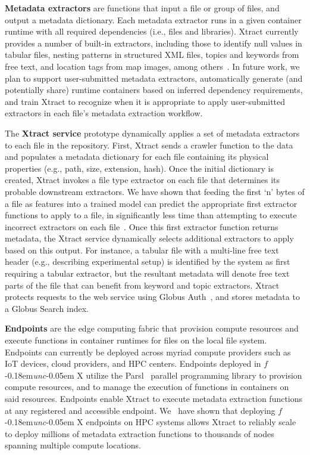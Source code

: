\documentclass[sigconf, 9pt]{acmart}
\newcommand{\name}{Xtract}
\newcommand{\funcx}{$f$\kern-0.18em\emph{unc}\kern-0.05em X}
\begin{document}
\textbf{Metadata extractors} are functions that input a file or group of files, and output a metadata dictionary. 
Each metadata extractor runs in a given container runtime with all required dependencies (i.e., files and 
libraries).  \name{} currently provides a number of built-in extractors, including
those to identify null values in tabular files, nesting patterns in structured XML files, topics and keywords from free text, and location tags from map images, 
among others~\cite{skluzacek2019serverless}. In future work, 
we plan to support user-submitted metadata extractors, automatically generate (and potentially share) runtime containers based on inferred 
dependency requirements, and train \name{} to recognize when it is appropriate to apply user-submitted extractors in each file's metadata extraction workflow. 

The \textbf{\name{} service} prototype dynamically applies a set of metadata extractors to each file in the repository. 
First, \name{} sends a crawler function to the data and populates a metadata dictionary for each file containing
its physical properties (e.g., path, size, extension, hash).  Once the initial dictionary is created, \name{} invokes a file type extractor on each 
file that determines its probable downstream extractors. We have shown that feeding 
the first `n' bytes of a file as features into 
a trained model can predict the appropriate first extractor functions to apply to a file, in significantly less time
than attempting to execute incorrect extractors on each file~\cite{skluzacek2018skluma}. Once this first extractor function returns metadata, the \name{} service dynamically selects additional extractors to apply based on this output.  For instance, 
a tabular file with a multi-line free text header (e.g., describing experimental setup) is identified by the system as first requiring a tabular extractor, but 
the resultant metadata will denote free text parts of the file that can benefit from keyword and topic extractors.
\name{} protects requests to the web service using Globus Auth~\cite{tuecke2016globus}, and stores metadata to a Globus Search index. 

\textbf{Endpoints} are the edge computing fabric that provision compute resources and execute functions in container runtimes for files on the local file system.
 Endpoints can currently be deployed across myriad compute providers such as IoT devices, cloud providers, and HPC centers.  
Endpoints deployed in \funcx{} utilize the Parsl~\cite{babuji2019parsl} parallel programming library to 
provision compute resources, and to manage the execution of functions in containers on said resources. Endpoints enable 
\name{} to execute metadata extraction functions at any registered and accessible endpoint. We~\cite{chard2019serverless} have shown that deploying \funcx{} 
endpoints on HPC systems allows \name{} to reliably
scale to deploy millions of metadata extraction functions to thousands of nodes spanning multiple compute locations. 
\end{document}

